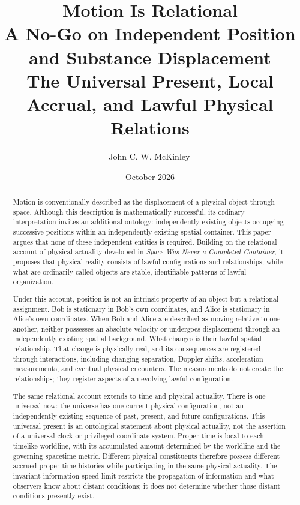 \documentclass[12pt,onecolumn]{article}
\title{
\textbf{Motion Is Relational}\\
\large A No-Go on Independent Position and Substance Displacement\\[0.5em]
\large The Universal Present, Local Accrual, and Lawful Physical Relations
}
\author{John C. W. McKinley\,\orcidlink{0009-0005-7097-5035}}
\date{October 2026}
\begin{document}
\maketitle

\begin{abstract}
Motion is conventionally described as the displacement of a physical object through space. Although this description is mathematically successful, its ordinary interpretation invites an additional ontology: independently existing objects occupying successive positions within an independently existing spatial container. This paper argues that none of these independent entities is required. Building on the relational account of physical actuality developed in \emph{Space Was Never a Completed Container}, it proposes that physical reality consists of lawful configurations and relationships, while what are ordinarily called objects are stable, identifiable patterns of lawful organization.

Under this account, position is not an intrinsic property of an object but a relational assignment. Bob is stationary in Bob's own coordinates, and Alice is stationary in Alice's own coordinates. When Bob and Alice are described as moving relative to one another, neither possesses an absolute velocity or undergoes displacement through an independently existing spatial background. What changes is their lawful spatial relationship. That change is physically real, and its consequences are registered through interactions, including changing separation, Doppler shifts, acceleration measurements, and eventual physical encounters. The measurements do not create the relationships; they register aspects of an evolving lawful configuration.

The same relational account extends to time and physical actuality. There is one universal now: the universe has one current physical configuration, not an independently existing sequence of past, present, and future configurations. This universal present is an ontological statement about physical actuality, not the assertion of a universal clock or privileged coordinate system. Proper time is local to each timelike worldline, with its accumulated amount determined by the worldline and the governing spacetime metric. Different physical constituents therefore possess different accrued proper-time histories while participating in the same physical actuality. The invariant information speed limit restricts the propagation of information and what observers know about distant conditions; it does not determine whether those distant conditions presently exist.


\end{abstract}
\end{document}
